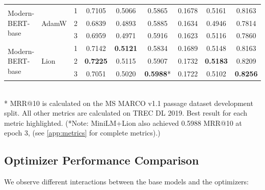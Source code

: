\documentclass[conference]{IEEEtran}
\begin{document}
\begin{table}[htbp]
\begin{tabular}{l l c c c c c c c}
\midrule
\multirow{3}{*}{Modern-BERT-base} & \multirow{3}{*}{AdamW}
    & 1 & 0.7105 & 0.5066 & 0.5865 & 0.1678 & 0.5161 & 0.8163 \\
    & & 2 & 0.6839 & 0.4893 & 0.5885 & 0.1634 & 0.4946 & 0.7814 \\
    & & 3 & 0.6959 & 0.4971 & 0.5916 & 0.1623 & 0.5116 & 0.7860 \\ %
\midrule
\multirow{3}{*}{Modern-BERT-base} & \multirow{3}{*}{Lion}
    & 1 & 0.7142 & \cellcolor{yellow!50}\textbf{0.5121} & 0.5834 & 0.1689 & 0.5148 & 0.8163 \\
    & & 2 & \cellcolor{yellow!50}\textbf{0.7225} & 0.5115 & 0.5907 & 0.1732 & \cellcolor{yellow!50}\textbf{0.5183} & 0.8209 \\
    & & 3 & 0.7051 & 0.5020 & \cellcolor{yellow!50}\textbf{0.5988}* & 0.1722 & 0.5102 & \cellcolor{yellow!50}\textbf{0.8256} \\
\bottomrule
\end{tabular}
\vspace{1em}\\
\footnotesize{* MRR@10 is calculated on the MS MARCO v1.1 passage dataset development split. All other metrics are calculated on TREC DL 2019. Best result for each metric highlighted. (*Note: MiniLM+Lion also achieved 0.5988 MRR@10 at epoch 3, (see \autoref{app:metrics} for complete metrics).)}
\end{table}

\subsection{Optimizer Performance Comparison}
We observe different interactions between the base models and the optimizers:
\end{document}
